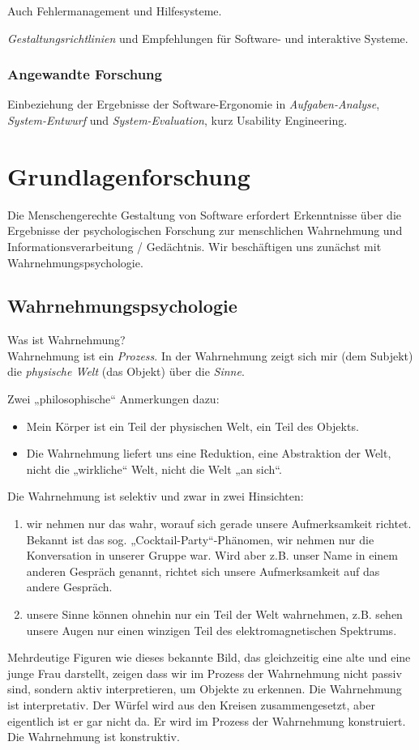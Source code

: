 Auch Fehlermanagement und Hilfesysteme.

\emph{Gestaltungsrichtlinien} und Empfehlungen für Software- und interaktive Systeme.
 
\subsubsection*{Angewandte Forschung}
Einbeziehung der Ergebnisse der Software-Ergonomie in \emph{Aufgaben-Analyse}, \emph{System-Entwurf} und \emph{System-Evaluation}, kurz Usability Engineering.

\section{Grundlagenforschung}
Die Menschengerechte Gestaltung von Software erfordert Erkenntnisse über die Ergebnisse der psychologischen Forschung zur menschlichen Wahrnehmung und Informationsverarbeitung / Gedächtnis. Wir beschäftigen uns zunächst mit Wahrnehmungspsychologie.

\subsection{Wahrnehmungspsychologie}
Was ist Wahrnehmung?\\
Wahrnehmung ist ein \emph{Prozess}. In der Wahrnehmung zeigt sich mir (dem Subjekt) die \emph{physische Welt} (das Objekt) über die \emph{Sinne}. 

Zwei „philosophische“ Anmerkungen dazu:
\begin{itemize}
\item Mein Körper ist ein Teil der physischen Welt, ein Teil des Objekts.
\item Die Wahrnehmung liefert uns eine Reduktion, eine Abstraktion der Welt, nicht die „wirkliche“ Welt, nicht die Welt „an sich“.
\end{itemize}
Die Wahrnehmung ist selektiv und zwar in zwei Hinsichten:
\begin{enumerate}
\item wir nehmen nur das wahr, worauf sich gerade unsere Aufmerksamkeit richtet. Bekannt ist das sog. „Cocktail-Party“-Phänomen, wir nehmen nur die Konversation in unserer Gruppe war. Wird aber z.B. unser Name in einem anderen Gespräch genannt, richtet sich unsere Aufmerksamkeit auf das andere Gespräch. 
\item unsere Sinne können ohnehin nur ein Teil der Welt wahrnehmen, z.B. sehen unsere Augen nur einen winzigen Teil des elektromagnetischen Spektrums.
\end{enumerate}
Mehrdeutige Figuren wie dieses bekannte Bild, das gleichzeitig eine alte und eine junge Frau darstellt, zeigen dass wir im Prozess der Wahrnehmung nicht passiv sind, sondern aktiv interpretieren, um Objekte zu erkennen. Die Wahrnehmung ist interpretativ.
Der Würfel wird aus den Kreisen zusammengesetzt, aber eigentlich ist er gar nicht da. Er wird im Prozess der Wahrnehmung konstruiert. Die Wahrnehmung ist konstruktiv.

